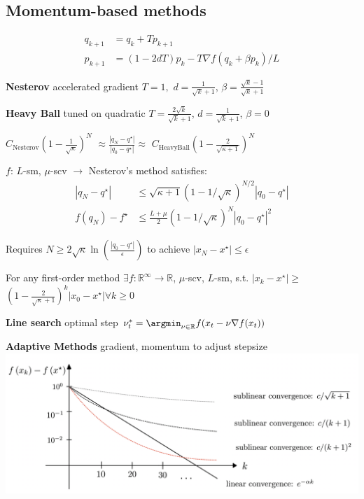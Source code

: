 \subsection{Momentum-based methods}
\vspace{-3.5mm}
\[\begin{aligned}
		q_{k+1} & = q_k + Tp_{k+1}                          \\
		p_{k+1} & = (1-2dT)p_k-T\nabla f(q_k + \beta p_k)/L
	\end{aligned}\]
\vspace{-2.7mm}

\textbf{Nesterov}
accelerated gradient
$T = 1,$
$d=\frac{1}{\sqrt{k}+1}$,
$\beta =\frac{\sqrt{k}-1}{\sqrt{k}+1}$

\textbf{Heavy Ball}
tuned on quadratic
$T = \frac{2\sqrt{k}}{\sqrt{k}+1}$,
$d=\frac{1}{\sqrt{k}+1}$,
$\beta=0$


\begin{centering}
	$C_\text{Nesterov}(1-\frac{1}{\sqrt{\kappa}})^N$
	$\approx\frac{|q_N-q^\star|}{|q_0-q^\star|}\approx$
	$C_\text{HeavyBall}(1-\frac{2}{\sqrt{\kappa+1}})^N$
\end{centering}

\begin{theorem}
	$f$: $L$-sm, $\mu$-scv
	$\rightarrow$
	Nesterov's method satisfies:
	\vspace{-1mm}
	\[  \begin{aligned}
			|q_N-q^\star|  & \le
			\sqrt{\kappa+1}(1-1/\sqrt{\kappa})^{N/2}|q_0-q^\star|
			\\
			f(q_N)-f^\star & \le
			\frac{L+\mu}{2}(1-1/\sqrt{\kappa})^{N}|q_0-q^\star|^2
		\end{aligned}\]
\end{theorem}
\vspace{-2mm}

Requires
$N\ge2\sqrt{\kappa}\operatorname{ln}(\frac{|q_{0}-q^\star|}{\epsilon})$
to achieve
$|x_{N}-x^\star|\le\epsilon$

\begin{theorem}
	For any first-order method
	$\exists f: \mathbb{R}^{\infty}\rightarrow\mathbb{R}$,
	$\mu$-scv, $L$-sm,
	s.t.
	$|x_k - x^\star|\ge$
	$(1-\frac{2}{\sqrt{\kappa}+1})^k|x_0 - x^\star| \forall k\ge 0$

\end{theorem}

\textbf{Line search}
optimal step
$\nu_t^*=\argmin_{\nu\in\mathbb{R}}f(x_t-\nu\nabla f(x_t))$

\textbf{Adaptive Methods}
gradient, momentum to adjust stepsize
\includegraphics[width=.95\columnwidth]{images/sublinear.png}

